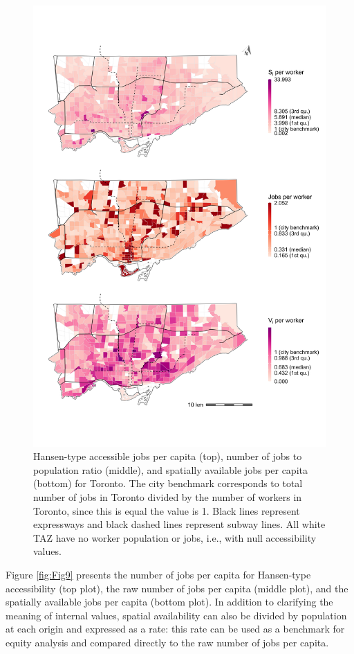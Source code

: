 \documentclass[10pt,letterpaper]{article}
\begin{document}
\begin{figure}
\includegraphics[width=1\linewidth]{images/Fig9} \caption{\label{fig:Fig9}Hansen-type accessible jobs per capita (top), number of jobs to population ratio (middle), and spatially available jobs per capita (bottom) for Toronto. The city benchmark corresponds to total number of jobs in Toronto divided by the number of workers in Toronto, since this is equal the value is 1. Black lines represent expressways and black dashed lines represent subway lines. All white TAZ have no worker population or jobs, i.e., with null accessibility values.}\label{fig:rate-accessibility-plot}
\end{figure}

Figure \ref{fig:Fig9} presents the number of jobs per capita for
Hansen-type accessibility (top plot), the raw number of jobs per capita
(middle plot), and the spatially available jobs per capita (bottom
plot). In addition to clarifying the meaning of internal values, spatial
availability can also be divided by population at each origin and
expressed as a rate: this rate can be used as a benchmark for equity
analysis and compared directly to the raw number of jobs per capita.
\end{document}
